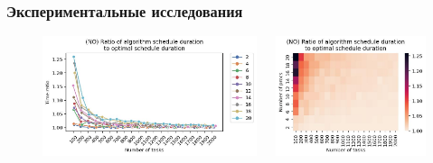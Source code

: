 \begin{frame}
    \frametitle{Экспериментальные исследования}
    \begin{figure}
        \begin{columns}
            \begin{column}{0.5\textwidth}
                \includegraphics[width=\textwidth]{imgs/experiments/NO/full_analysis/NO/gr_amalgamated.jpg}
            \end{column}
            \begin{column}{0.5\textwidth}
                \includegraphics[width=\textwidth]{imgs/experiments/NO/full_analysis/NO/tr_heatmap.jpg}
            \end{column}
        \end{columns}
    \end{figure}
\end{frame}

